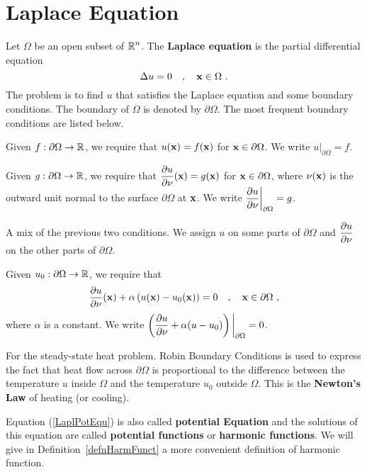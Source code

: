 \chapter{Laplace Equation} \label{ChapLaplace}

Let $\Omega$ be an open subset of $\displaystyle \mathbb{R}^n$.  The
{\bfseries Laplace equation}
is the partial differential equation
\begin{equation} \label{LaplPotEqu}
\Delta u = 0 \quad , \quad \mathbf{x} \in \Omega \ .
\end{equation}
The problem is to find $u$ that satisfies the Laplace equation and some
boundary conditions.  The boundary of $\Omega$ is denoted by
$\partial \Omega$.  The most frequent boundary conditions are listed
below.

 Given
$f:\partial \Omega \rightarrow \mathbb{R}$, we require that
$u(\mathbf{x}) = f(\mathbf{x})$ for $\mathbf{x} \in \partial \Omega$.  We write
$\displaystyle u\big|_{\partial \Omega} = f$.

 Given
$g:\partial \Omega \rightarrow \mathbb{R}$, we require that
$\displaystyle \frac{\partial{u}}{\partial \mathbf{\nu}}(\mathbf{x}) = g(\mathbf{x})$
for $\mathbf{x} \in \partial \Omega$, where $\mathbf{\nu}(\mathbf{x})$ is the
outward unit normal to the surface $\partial \Omega$ at $\mathbf{x}$.  We write
$\displaystyle \frac{\partial{u}}{\partial \mathbf{\nu}} \bigg|_{\partial \Omega} = g$.

 A mix of the previous two conditions.
We assign $u$ on some parts of $\partial \Omega$ and
$\displaystyle \frac{\partial{u}}{\partial \mathbf{\nu}}$ on the other parts of $\partial \Omega$.

 Given
$u_0:\partial \Omega \rightarrow \mathbb{R}$, we require that
\[
\pdydx{u}{\VEC{\nu}}(\VEC{x}) + \alpha \left( u(\VEC{x})
- u_0(\VEC{x}) \right) = 0 \quad , \quad \VEC{x} \in \partial \Omega \ ,
\]
where $\alpha$ is a constant.  We write
$\displaystyle \left( \frac{\partial{u}}{\partial \mathbf{\nu}} +
\alpha (u - u_0)\right)\bigg|_{\partial \Omega} = 0$.

For the steady-state heat problem.  Robin Boundary Conditions is used
to express the fact that heat flow across $\partial \Omega$ is
proportional to the difference between the temperature $u$ inside
$\Omega$ and the temperature $u_0$ outside $\Omega$.  This is the
{\bfseries Newton's Law} of heating
(or cooling).

Equation (\ref{LaplPotEqu}) is also called
{\bfseries potential Equation} and the
solutions of this equation are called
{\bfseries potential functions} or
{\bfseries harmonic functions}.  We will
give in Definition~\ref{defnHarmFunct} a more convenient definition of
harmonic function.


